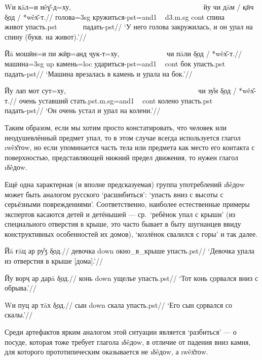 \begingl
\gla Wи кāл=и нêɣ̌-д=ху, ~~~~~~~~~~~~~~~~~~~~~~~~~~~~~~~~~~~~ йу чи дāм / қӣч \b{δод} / *wêх̌-т.//
 голова={\sc 3sg} кружиться-{\sc pst=and1} ~ {\sc d3.m.sg} {\sc cont} спина ~~~~~~ живот упасть.{\sc pst} ~~~~~~ падать-{\sc pst}//
\glft ‘У него голова закружилась, и он \b{упал} на спину (букв. на живот).’//
\endgl \xe

\begingl
\gla Йā мошӣн=и пи жӣр=анд ҷук-т=ху, ~~~~~~~~~~~~ чи пāли \b{δод} / *wêх̌-т.//
 машина={\sc 3sg} {\sc up} камень={\sc loc} удариться-{\sc pst=and1} ~ {\sc cont} бок упасть.{\sc pst} ~~~~~~ падать-{\sc pst}//
\glft ‘Машина врезалась в камень и \b{упала} на бок.’//
\endgl \xe

\begingl
\gla Йу лап мот сут=ху, ~~~~~~~~~~~~~~~~~~~~~~~~~~~~~~~~~~~~ чи зу̊н \b{δод} / *wêх̌-т.//
 очень уставший стать.{\sc pst.m.sg=and1} ~ {\sc cont} колено упасть.{\sc pst} ~~~~~~ падать-{\sc pst}//
\glft ‘Он очень устал и \b{упал} на колени.’//
\endgl \xe

Таким образом, если мы хотим просто констатировать, что человек или неодушевлённый предмет упал, то в этом случае всегда используется глагол \i{wêх̌тоw}, но если упоминается часть тела или предмета как место его контакта с поверхностью, представляющей нижний предел движения, то нужен глагол \i{δêдоw}.

Ещё одна характерная (и вполне предсказуемая) группа употреблений \i{δêдоw} может быть аналогом русского ‘расшибиться’: ‘упасть вниз с высоты с серьёзными повреждениями’. Соответственно, наиболее естественные примеры экспертов касаются детей и детёнышей — ср.~‘ребёнок упал с крыши’ (из специального отверстия в крыше, это часто бывает в быту шугнанцев ввиду конструктивных особенностей их домов), ‘козлёнок свалился с горы’ и так далее.

\begingl
\gla Йā ғāц ар ру̊ӡ \b{δод}.//
 девочка {\sc down} окно\_в\_крыше упасть.{\sc pst}//
\glft ‘Девочка \b{упала} из отверстия в крыше [дома].’//
\endgl \xe

\begingl
\gla Йу ворҷ ар дарā \b{δод}.//
 конь {\sc down} ущелье упасть.{\sc pst}//
\glft ‘Тот конь \b{сорвался} вниз с обрыва.’//
\endgl \xe

\begingl
\gla Wи пуц ар тāх \b{δод}.//
 сын {\sc down} скала упасть.{\sc pst}//
\glft ‘Его сын \b{сорвался} со скалы.’//
\endgl \xe

Среди артефактов ярким аналогом этой ситуации является ‘разбиться’ — о посуде, которая тоже требует глагола \i{δêдоw}, в отличие от падения вниз камня, для которого прототипическим оказывается не \i{δêдоw}, а \i{wêх̌тоw}.

